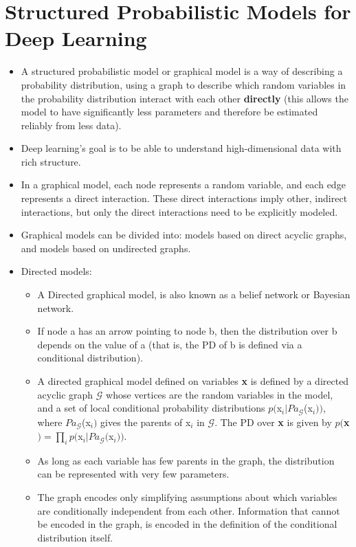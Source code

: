 \documentclass{article}
\begin{document}
\section{Structured Probabilistic Models for Deep Learning}
\begin{itemize}
\item A structured probabilistic model or graphical model is a way of describing a probability distribution, using a graph to describe which random variables in the probability distribution interact with each other \textbf{directly} (this allows the model to have significantly less parameters and therefore be estimated reliably from less data).
\item Deep learning's goal is to be able to understand high-dimensional data with rich structure.
\item In a graphical model, each node represents a random variable, and each edge represents a direct interaction. These direct interactions imply other, indirect interactions, but only the direct interactions need to be explicitly modeled.
\item Graphical models can be divided into: models based on direct acyclic graphs, and models based on undirected graphs.
\item Directed models:
\begin{itemize}
\item A Directed graphical model, is also known as a belief network or Bayesian network.
\item If node a has an arrow pointing to node b, then the distribution over b depends on the value of a (that is, the PD of b is defined via a conditional distribution).
\item A directed graphical model defined on variables \textbf{x} is defined by a directed acyclic graph \(\mathcal{G}\) whose vertices are the random variables in the model, and a set of local conditional probability distributions \(p(\)x\(_i | Pa_{\mathcal{G}}\)(x\(_i))\), where \(Pa_{\mathcal{G}}\)(x\(_i)\) gives the parents of x\(_i\) in \(\mathcal{G}\). The PD over \textbf{x} is given by \(p(\)\textbf{x}\() = \prod_i p(\)x\(_i | Pa_{\mathcal{G}}(\)x\(_i))\).
\item As long as each variable has few parents in the graph, the distribution can be represented with very few parameters.
\item The graph encodes only simplifying assumptions about which variables are conditionally independent from each other. Information that cannot be encoded in the graph, is encoded in the definition of the conditional distribution itself.

\end{itemize}
\end{itemize}
\end{document}
